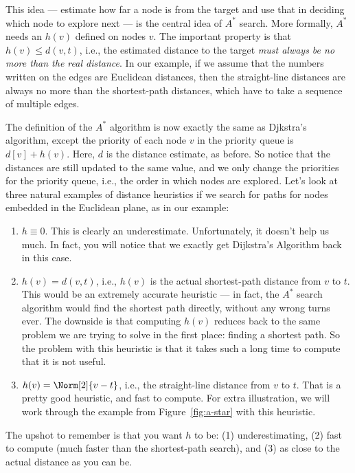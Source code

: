 This idea --- estimate how far a node is from the target and use that
in deciding which node to explore next --- is the central idea of
$A^*$ search. More formally, $A^*$ needs an  $h(v)$ defined on nodes $v$. The important
property is that $h(v) \leq d(v,t)$, i.e., the estimated distance to
the target \emph{must always be no more than the real distance}.
In our example, if we assume that the numbers written on the edges are
Euclidean distances, then the straight-line distances are always no
more than the shortest-path distances, which have to take a sequence
of multiple edges.

The definition of the $A^*$ algorithm is now exactly the same as
Djkstra's algorithm, except the priority of each node $v$ in the
priority queue is $d[v] + h(v)$. Here, $d$ is the distance estimate,
as before. So notice that the distances are still updated to the same
value, and we only change the priorities for the priority queue, i.e.,
the order in which nodes are explored. Let's look at three natural
examples of distance heuristics if we search for paths for nodes
embedded in the Euclidean plane, as in our example:

\begin{enumerate}
\item $h \equiv 0$. This is clearly an underestimate. Unfortunately,
  it doesn't help us much. In fact, you will notice that we exactly
  get Dijkstra's Algorithm back in this case.
\item $h(v) = d(v,t)$, i.e., $h(v)$ is the actual shortest-path
  distance from $v$ to $t$. This would be an extremely accurate
  heuristic --- in fact, the $A^*$ search algorithm would find the
  shortest path directly, without any wrong turns ever. The downside
  is that computing $h(v)$ reduces back to the same problem we are
  trying to solve in the first place: finding a shortest path. So the
  problem with this heuristic is that it takes such a long time to
  compute that it is not useful.
\item $h(v) = \Norm[2]{v - t}$, i.e., the straight-line distance from
  $v$ to $t$. That is a pretty good heuristic, and fast to
  compute. For extra illustration, we will work through the example
  from Figure~\ref{fig:a-star} with this heuristic.
\end{enumerate}

The upshot to remember is that you want $h$ to be: (1)
underestimating, (2) fast to compute (much faster than the
shortest-path search), and (3) as close to the actual distance as you
can be.

